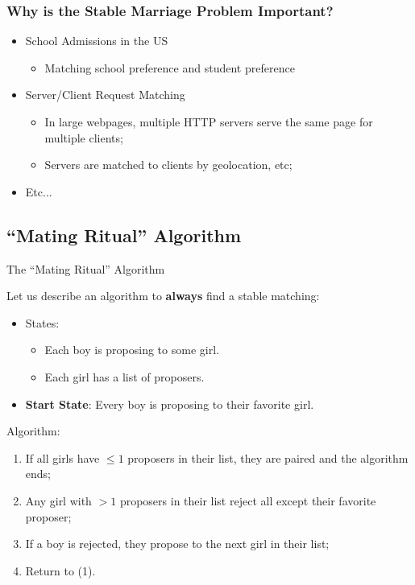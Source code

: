 \begin{frame}
  \frametitle{Why is the Stable Marriage Problem Important?}

  {\larger
    \begin{itemize}
    \item School Admissions in the US
    \begin{itemize}
      \item Matching school preference and student preference
    \end{itemize}\bigskip


    \item Server/Client Request Matching
    \begin{itemize}
      \item In large webpages, multiple HTTP servers serve the same page for multiple clients;
      \item Servers are matched to clients by geolocation, etc;
    \end{itemize}\bigskip

    \item Etc...
    \end{itemize}
  }
\end{frame}

\subsection{``Mating Ritual'' Algorithm}

\begin{frame}{The ``Mating Ritual'' Algorithm}

    Let us describe an algorithm to {\bf always} find a
    stable matching:\bigskip

    \begin{itemize}
      \item {States}:
      \begin{itemize}
        \item Each boy is proposing to some girl.
        \item Each girl has a list of proposers.
      \end{itemize}
      \item {\bf Start State}: Every boy is proposing to their favorite girl.
    \end{itemize}

    Algorithm:
    \begin{enumerate}
      \item If all girls have $\leq 1$ proposers in their list, they are paired and the algorithm ends;
      \item Any girl with $> 1$ proposers in their list reject all except their favorite proposer;
      \item If a boy is rejected, they propose to the next girl in their list;
      \item Return to (1).
    \end{enumerate}
\end{frame}

